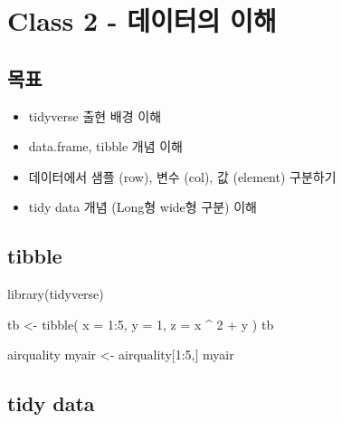 \documentclass[
]{book}
\newenvironment{Shaded}{\begin{snugshade}}{\end{snugshade}}
\newcommand{\AttributeTok}[1]{\textcolor[rgb]{0.77,0.63,0.00}{#1}}
\newcommand{\DecValTok}[1]{\textcolor[rgb]{0.00,0.00,0.81}{#1}}
\newcommand{\FunctionTok}[1]{\textcolor[rgb]{0.00,0.00,0.00}{#1}}
\newcommand{\NormalTok}[1]{#1}
\newcommand{\OtherTok}[1]{\textcolor[rgb]{0.56,0.35,0.01}{#1}}
\newcommand{\SpecialCharTok}[1]{\textcolor[rgb]{0.00,0.00,0.00}{#1}}
\providecommand{\tightlist}{%
  \setlength{\itemsep}{0pt}\setlength{\parskip}{0pt}}
\begin{document}
\hypertarget{class-2---uxb370uxc774uxd130uxc758-uxc774uxd574}{%
\section{Class 2 - 데이터의 이해}\label{class-2---uxb370uxc774uxd130uxc758-uxc774uxd574}}

\hypertarget{uxbaa9uxd45c-1}{%
\subsection{목표}\label{uxbaa9uxd45c-1}}

\begin{itemize}
\tightlist
\item
  tidyverse 출현 배경 이해
\item
  data.frame, tibble 개념 이해
\item
  데이터에서 샘플 (row), 변수 (col), 값 (element) 구분하기
\item
  tidy data 개념 (Long형 wide형 구분) 이해
\end{itemize}

\hypertarget{tibble}{%
\subsection{tibble}\label{tibble}}

\begin{Shaded}
\begin{Highlighting}[]
\FunctionTok{library}\NormalTok{(tidyverse)}


\NormalTok{tb }\OtherTok{\textless{}{-}} \FunctionTok{tibble}\NormalTok{(}
  \AttributeTok{x =} \DecValTok{1}\SpecialCharTok{:}\DecValTok{5}\NormalTok{, }
  \AttributeTok{y =} \DecValTok{1}\NormalTok{, }
  \AttributeTok{z =}\NormalTok{ x }\SpecialCharTok{\^{}} \DecValTok{2} \SpecialCharTok{+}\NormalTok{ y}
\NormalTok{)}
\NormalTok{tb}
\end{Highlighting}
\end{Shaded}

\begin{Shaded}
\begin{Highlighting}[]
\NormalTok{airquality}
\NormalTok{myair }\OtherTok{\textless{}{-}}\NormalTok{ airquality[}\DecValTok{1}\SpecialCharTok{:}\DecValTok{5}\NormalTok{,]}
\NormalTok{myair}
\end{Highlighting}
\end{Shaded}

\hypertarget{tidy-data}{%
\subsection{tidy data}\label{tidy-data}}
\end{document}
